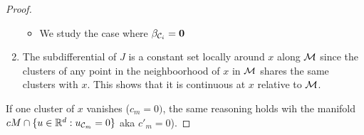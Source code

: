 \begin{proof}
\begin{enumerate}
\begin{itemize}
  \item  We study the case where $\beta_{\mathcal{C}_i} = \textbf{0}$

\end{itemize}
  \item The subdifferential of $J$ is a constant set locally around $x$ along $\mathcal{M}$ since the clusters of any point in the neighboorhood of $x$ in $\mathcal{M}$ shares the same clusters with $x$. 
  This shows that it is continuous at $x$ relative to $\mathcal{M}$. 
\end{enumerate}







  If one cluster of $x$ vanishes ($c_m = 0)$, the same reasoning holds wih the manifold $cM \cap \{u \in \mathbb{R}^d: u_{\mathcal{C}_m} = 0\}$ aka $c'_m = 0$).
\end{proof}
